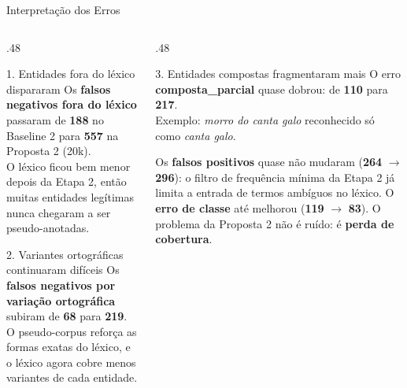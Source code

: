 \documentclass[aspectratio=169, 9pt]{beamer}
\begin{document}
\begin{frame}{Interpretação dos Erros}
  \begin{columns}[T]
    \begin{column}{.48\textwidth}
      \begin{block}{1. Entidades fora do léxico dispararam}
        Os \textbf{falsos negativos fora do léxico} passaram de \textbf{188} no Baseline 2 para \textbf{557} na Proposta 2 (20k).\\[2pt]
        O léxico ficou bem menor depois da Etapa 2, então muitas entidades legítimas nunca chegaram a ser pseudo-anotadas.
      \end{block}

      \vspace{6pt}
      \begin{block}{2. Variantes ortográficas continuaram difíceis}
        Os \textbf{falsos negativos por variação ortográfica} subiram de \textbf{68} para \textbf{219}.\\[2pt]
        O pseudo-corpus reforça as formas exatas do léxico, e o léxico agora cobre menos variantes de cada entidade.
      \end{block}
    \end{column}

    \begin{column}{.48\textwidth}
      \begin{alertblock}{3. Entidades compostas fragmentaram mais}
        O erro \textbf{composta\_parcial} quase dobrou: de \textbf{110} para \textbf{217}.\\[2pt]
        Exemplo: \textit{morro do canta galo} reconhecido só como \textit{canta galo}.
      \end{alertblock}

      \vspace{8pt}
      \small
      Os \textbf{falsos positivos} quase não mudaram (\textbf{264} $\rightarrow$ \textbf{296}): o filtro de frequência mínima da Etapa 2 já limita a entrada de termos ambíguos no léxico. O \textbf{erro de classe} até melhorou (\textbf{119} $\rightarrow$ \textbf{83}). O problema da Proposta 2 não é ruído: é \textbf{perda de cobertura}.
    \end{column}
  \end{columns}
\end{frame}
\end{document}
